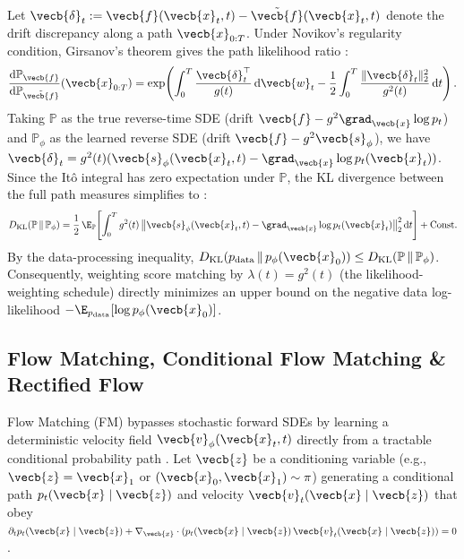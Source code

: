\documentclass[../../../../master.tex]{subfiles}
\begin{document}
\begin{coremath}
Let $\vecb{\delta}_t := \vecb{f}(\vecb{x}_t, t) - \tilde{\vecb{f}}(\vecb{x}_t, t)$ denote the drift discrepancy along a path $\vecb{x}_{0:T}$. Under Novikov's regularity condition, Girsanov's theorem gives the path likelihood ratio :
\begin{equation}\label{eq:sde:girsanov_ratio}
  \frac{\mathrm{d}\mathbb{P}_{\vecb{f}}}{\mathrm{d}\mathbb{P}_{\tilde{\vecb{f}}}}(\vecb{x}_{0:T}) = \exp\!\left( \int_0^T \frac{\vecb{\delta}_t^\top}{g(t)}\,\mathrm{d}\vecb{w}_t - \frac{1}{2}\int_0^T \frac{\|\vecb{\delta}_t\|_2^2}{g^2(t)}\,\mathrm{d}t \right).
\end{equation}
Taking $\mathbb{P}$ as the true reverse-time SDE (drift $\vecb{f} - g^2\grad_{\vecb{x}}\log p_t$) and $\mathbb{P}_\phi$ as the learned reverse SDE (drift $\vecb{f} - g^2\vecb{s}_\phi$), we have $\vecb{\delta}_t = g^2(t)(\vecb{s}_\phi(\vecb{x}_t, t) - \grad_{\vecb{x}}\log p_t(\vecb{x}_t))$. Since the It\^o integral has zero expectation under $\mathbb{P}$, the KL divergence between the full path measures simplifies to :
\begin{equation}\label{eq:sde:girsanov_kl}
  D_{\mathrm{KL}}(\mathbb{P} \,\|\, \mathbb{P}_\phi) = \frac{1}{2}\,\E_{\mathbb{P}}\!\left[ \int_0^T g^2(t)\,\bigl\|\vecb{s}_\phi(\vecb{x}_t, t) - \grad_{\vecb{x}}\log p_t(\vecb{x}_t)\bigr\|_2^2\,\mathrm{d}t \right] + \mathrm{Const.}
\end{equation}
By the data-processing inequality, $D_{\mathrm{KL}}(p_{\mathrm{data}} \,\|\, p_\phi(\vecb{x}_0)) \le D_{\mathrm{KL}}(\mathbb{P} \,\|\, \mathbb{P}_\phi)$. Consequently, weighting score matching by $\lambda(t) = g^2(t)$ (the likelihood-weighting schedule) directly minimizes an upper bound on the negative data log-likelihood $-\E_{p_{\mathrm{data}}}[\log p_\phi(\vecb{x}_0)]$.
\end{coremath}

\subsection{Flow Matching, Conditional Flow Matching \& Rectified Flow}\label{sec:sde:flow_matching}

Flow Matching (FM) bypasses stochastic forward SDEs by learning a deterministic velocity field $\vecb{v}_\phi(\vecb{x}_t, t)$ directly from a tractable conditional probability path . Let $\vecb{z}$ be a conditioning variable (e.g., $\vecb{z} = \vecb{x}_1$ or $(\vecb{x}_0, \vecb{x}_1) \sim \pi$) generating a conditional path $p_t(\vecb{x} \mid \vecb{z})$ and velocity $\vecb{v}_t(\vecb{x} \mid \vecb{z})$ that obey $\partial_t p_t(\vecb{x} \mid \vecb{z}) + \nabla_{\vecb{x}} \cdot (p_t(\vecb{x} \mid \vecb{z})\,\vecb{v}_t(\vecb{x} \mid \vecb{z})) = 0$.
\end{document}
